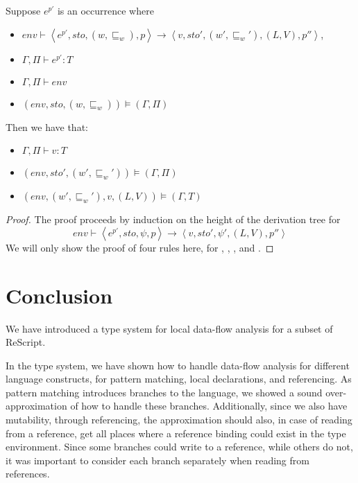 \documentclass[acmsmall,sigplan]{acmart}
\begin{document}
\begin{theorem}
	Suppose $e^{p'}$ is an occurrence where
	\begin{itemize}
		\item $env\vdash\left\langle e^{p'},sto,(w,\sqsubseteq_w),p\right\rangle\rightarrow\left\langle v,sto',(w',\sqsubseteq_w'),(L,V),p''\right\rangle$,
		\item $\Gamma,\Pi\vdash e^{p'} : T$
		\item $\Gamma,\Pi\vdash env$
		\item $(env,sto,(w,\sqsubseteq_w))\models(\Gamma,\Pi)$
	\end{itemize}
	Then we have that:
	\begin{itemize}
		\item $\Gamma,\Pi\vdash v:T$
		\item $(env,sto',(w',\sqsubseteq_w'))\models(\Gamma,\Pi)$
		\item $(env,(w',\sqsubseteq_w'),v,(L,V))\models(\Gamma,T)$
	\end{itemize}
\end{theorem}
\begin{proof}
	The proof proceeds by induction on the height of the derivation tree for 
	$$env\vdash\left\langle e^{p'},sto,\psi,p\right\rangle\rightarrow\left\langle v,sto',\psi',(L,V),p''\right\rangle$$
	We will only show the proof of four rules here, for , , , and .%

\end{proof}

% 

\section{Conclusion}\label{sec:Conc}

We have introduced a type system for local data-flow analysis for a
subset of ReScript. 

In the type system, we have shown how to handle data-flow analysis for
different language constructs, for pattern matching, local
declarations, and referencing. 
As pattern matching introduces branches to the language, we showed a
sound over-approximation of how to handle these branches. 
Additionally, since we also have mutability, through referencing, the approximation should also, in case of reading from a reference, get all places where a reference binding could exist in the type environment.
Since some branches could write to a reference, while others do not, it was important to consider each branch separately when reading from references.
\end{document}
